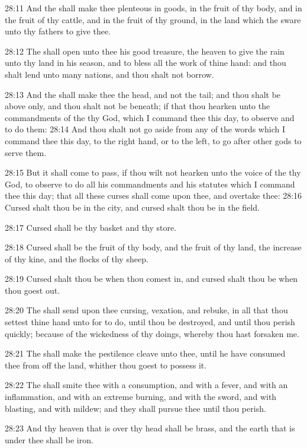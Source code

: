 28:11 And the \LORD shall make thee plenteous in goods, in the fruit of thy body, and in the fruit of thy cattle, and in the fruit of thy ground, in the land which the \LORD sware unto thy fathers to give thee.

28:12 The \LORD shall open unto thee his good treasure, the heaven to give the rain unto thy land in his season, and to bless all the work of thine hand: and thou shalt lend unto many nations, and thou shalt not borrow.

28:13 And the \LORD shall make thee the head, and not the tail; and thou shalt be above only, and thou shalt not be beneath; if that thou hearken unto the commandments of the \LORD thy God, which I command thee this day, to observe and to do them: 28:14 And thou shalt not go aside from any of the words which I command thee this day, to the right hand, or to the left, to go after other gods to serve them.

28:15 But it shall come to pass, if thou wilt not hearken unto the voice of the \LORD thy God, to observe to do all his commandments and his statutes which I command thee this day; that all these curses shall come upon thee, and overtake thee: 28:16 Cursed shalt thou be in the city, and cursed shalt thou be in the field.

28:17 Cursed shall be thy basket and thy store.

28:18 Cursed shall be the fruit of thy body, and the fruit of thy land, the increase of thy kine, and the flocks of thy sheep.

28:19 Cursed shalt thou be when thou comest in, and cursed shalt thou be when thou goest out.

28:20 The \LORD shall send upon thee cursing, vexation, and rebuke, in all that thou settest thine hand unto for to do, until thou be destroyed, and until thou perish quickly; because of the wickedness of thy doings, whereby thou hast forsaken me.

28:21 The \LORD shall make the pestilence cleave unto thee, until he have consumed thee from off the land, whither thou goest to possess it.

28:22 The \LORD shall smite thee with a consumption, and with a fever, and with an inflammation, and with an extreme burning, and with the sword, and with blasting, and with mildew; and they shall pursue thee until thou perish.

28:23 And thy heaven that is over thy head shall be brass, and the earth that is under thee shall be iron.

